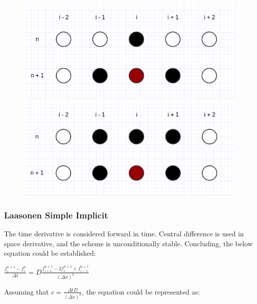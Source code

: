 \documentclass[12pt]{report}
\begin{document}
\begin{figure}[!htb]
\centering
\begin{minipage}{.5\textwidth}
  \centering
  \includegraphics[width=.8\linewidth]{laasonen.png}
\end{minipage}%
\begin{minipage}{.5\textwidth}
  \centering
  \includegraphics[width=.8\linewidth]{crank-nicholson.png}
\end{minipage}
\end{figure}

\subsubsection*{Laasonen Simple Implicit}
\par The time derivative is considered forward in time. Central difference is used in space derivative, and the scheme is unconditionally stable. Concluding, the below equation could be established:

\begin{center}
\Large
$
\frac{f_i^{n + 1} - f_i^{n}}{\Delta t} = D \frac{f_{i + 1}^{n + 1} - 2f_{i}^{n + 1} + f_{i - 1}^{n + 1}}{(\Delta x)^2} 
$
\end{center}

\par Assuming that $c = \frac{\Delta t D}{(\Delta x)^2}$, the equation could be represented as:
\end{document}
